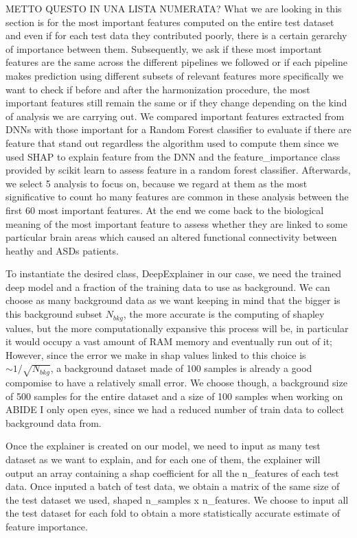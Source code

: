 \documentclass[10pt]{report}
\begin{document}
METTO QUESTO IN UNA LISTA NUMERATA?
What we are looking in this section is for the most important features computed on the entire test dataset and even if for each test data they contributed poorly, there is a certain gerarchy of importance between them.
Subsequently, we ask if these most important features are the same across the different pipelines we followed or if each pipeline makes prediction using different subsets of relevant features more specifically we want to check if before and after the harmonization procedure, the most important features still remain the same or if they change depending on the kind of analysis we are carrying out.
We compared important features extracted from DNNs with those important for a Random Forest classifier to evaluate if there are feature that stand out regardless the algorithm used to compute them since we used SHAP to explain feature from the DNN and the feature\_importance class  provided by scikit learn to assess feature in a random forest classifier.
Afterwards, we select 5 analysis to focus on, because we regard at them as the most significative to count ho many features are common in these analysis between the first 60 most important features.
At the end we come back to the biological meaning of the most important feature to assess whether they are linked to some particular brain areas which caused an altered functional connectivity between heathy and ASDs patients.

\hfill

To instantiate the desired class, DeepExplainer in our case, we need the trained deep model and a fraction of the training data to use as background. We can choose as many background data as we want keeping in mind that the bigger is this background subset $N_{bkg}$, the more accurate is the computing of shapley values, but the more computationally expansive this process will be, in particular it would occupy a vast amount of RAM memory and eventually run out of it;
However, since the error we make in shap values linked to this choice is $\sim 1/\sqrt{N_{bkg}}$, a background dataset made of 100 samples is already a good compomise to have a relatively small error.
We choose though, a background size of 500 samples for the entire dataset and a size of 100 samples when working on ABIDE I only open eyes, since we had a reduced number of train data to collect background data from.

Once the explainer is created on our model, we need to input as many test dataset as we want to explain, and for each one of them, the explainer will output an array containing a shap coefficient for all the n\_features of each test data.
Once inputed a batch of test data, we obtain a matrix of the same size of the test dataset we used, shaped n\_samples x n\_features.
We choose to input all the test dataset for each fold to obtain a more statistically accurate estimate of feature importance.
\end{document}

